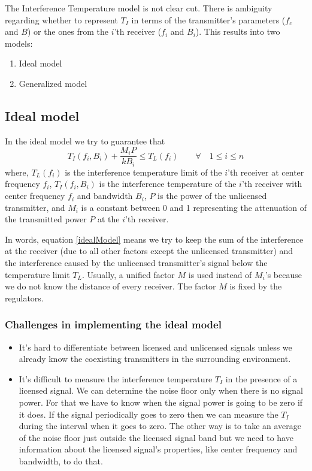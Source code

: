 \documentclass[12pt]{article}
\begin{document}
The Interference Temperature model\cite{clancy2006} is not clear cut. There is ambiguity regarding whether to represent $T_I$ in terms of the transmitter's parameters ($f_c$ and $B$) or the ones from the $i$'th receiver ($f_i$ and $B_i$).
This results into two models\cite{clancy2006}:
\begin{enumerate}
    \item Ideal model
    \item Generalized model
\end{enumerate}

\subsection*{Ideal model}

In the ideal model we try to guarantee that
\begin{equation}
    T_I(f_i,B_i) + \frac{M_iP}{kB_i} \leq T_L(f_i) \qquad \forall \quad 1 \leq i \leq n \label{idealModel}
\end{equation}
where, $T_L(f_i)$ is the interference temperature limit of the $i$'th receiver at center frequency $f_i$, $T_I(f_i,B_i)$ is  the interference temperature of the $i$'th receiver with center frequency $f_i$ and bandwidth $B_i$, $P$ is the power of the unlicensed transmitter, and $M_i$ is a constant between 0 and 1 representing the attenuation of the  transmitted power $P$ at the $i$'th receiver.

In words, equation \eqref{idealModel} means we try to keep the sum of the interference at the receiver (due to all other factors except the unlicensed transmitter) and the interference caused by the unlicensed transmitter's signal below the temperature limit $T_L$. Usually, a unified factor $M$ is used instead of $M_i$'s because we do not know the distance of every receiver. The factor $M$ is fixed by the regulators.

\subsubsection*{Challenges in implementing the ideal model}

\begin{itemize}
    \item It's hard to differentiate between licensed and unlicensed signals unless we already know the coexisting transmitters in the surrounding environment.
    \item It's difficult to measure the interference temperature $T_I$ in the presence of a licensed signal. We can determine the noise floor only when there is no signal power. For that we have to know when the signal power is going to be zero if it does. If the signal periodically goes to zero then we can measure the $T_I$ during the interval when it goes to zero. The other way is to take an average of the noise floor just outside the licensed signal band but we need to have information about the licensed signal's properties, like center frequency and bandwidth, to do that.
\end{itemize}
\end{document}
